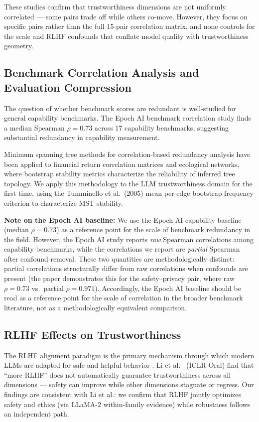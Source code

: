 These studies confirm that trustworthiness dimensions are not uniformly correlated --- some pairs trade off while others co-move. However, they focus on specific pairs rather than the full 15-pair correlation matrix, and none controls for the scale and RLHF confounds that conflate model quality with trustworthiness geometry.

\subsection{Benchmark Correlation Analysis and Evaluation Compression}

The question of whether benchmark scores are redundant is well-studied for general capability benchmarks. The Epoch AI benchmark correlation study \cite{epochai2024} finds a median Spearman $\rho = 0.73$ across 17 capability benchmarks, suggesting substantial redundancy in capability measurement.

Minimum spanning tree methods for correlation-based redundancy analysis have been applied to financial return correlation matrices \cite{tumminello2005tool} and ecological networks, where bootstrap stability metrics characterize the reliability of inferred tree topology. We apply this methodology to the LLM trustworthiness domain for the first time, using the Tumminello et al.\ (2005) mean per-edge bootstrap frequency criterion to characterize MST stability.

\textbf{Note on the Epoch AI baseline:} We use the Epoch AI capability baseline (median $\rho = 0.73$) as a reference point for the scale of benchmark redundancy in the field. However, the Epoch AI study reports \emph{raw} Spearman correlations among capability benchmarks, while the correlations we report are \emph{partial} Spearman after confound removal. These two quantities are methodologically distinct: partial correlations structurally differ from raw correlations when confounds are present (the paper demonstrates this for the safety--privacy pair, where raw $\rho = 0.73$ vs.\ partial $\rho = 0.971$). Accordingly, the Epoch AI baseline should be read as a reference point for the scale of correlation in the broader benchmark literature, not as a methodologically equivalent comparison.

\subsection{RLHF Effects on Trustworthiness}

The RLHF alignment paradigm is the primary mechanism through which modern LLMs are adapted for safe and helpful behavior \cite{ouyang2022training}. Li et al.\ \cite{li2025more} (ICLR Oral) find that ``more RLHF'' does not automatically guarantee trustworthiness across all dimensions --- safety can improve while other dimensions stagnate or regress. Our findings are consistent with Li et al.: we confirm that RLHF jointly optimizes safety and ethics (via LLaMA-2 within-family evidence) while robustness follows an independent path.

